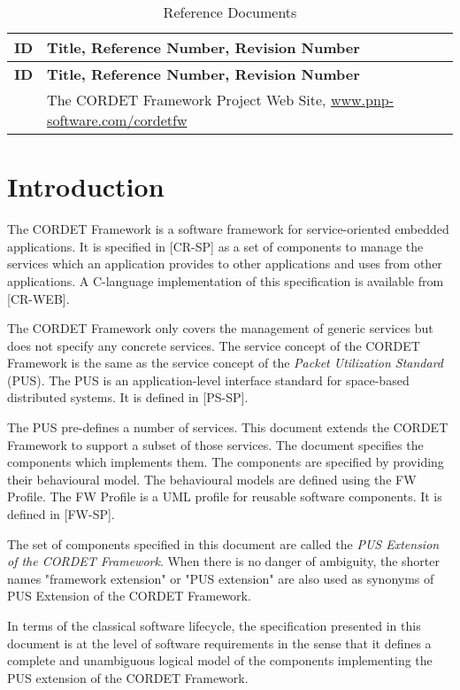 \documentclass{pnp_article}
\begin{document}
\begin{longtable}{|c|p{11cm}|}
\caption{Reference Documents} \label{tab:refDoc}\\
\hline
\rowcolor{light-gray}
\textbf{ID} & \textbf{Title, Reference Number, Revision Number} \\
\hline\hline
\endfirsthead
\rowcolor{light-gray}
\textbf{ID} & \textbf{Title, Reference Number, Revision Number} \\
\hline\hline
\endhead
[PS-WEB] & The CORDET Framework Project Web Site, \url{www.pnp-software.com/cordetfw} \\
\hline
\end{longtable}


\newpage


\section{Introduction}
The CORDET Framework is a software framework for service-oriented embedded applications. It is specified in [CR-SP] as a set of components to manage the services which an application provides to other applications and uses from other applications. A C-language implementation of this specification is available from [CR-WEB].

The CORDET Framework only covers the management of generic services but does not specify any concrete services. The service concept of the CORDET Framework is the same as the service concept of the \textit{Packet Utilization Standard} (PUS). The PUS is an application-level interface standard for space-based distributed systems. It is defined in [PS-SP].

The PUS pre-defines a number of services. This document extends the CORDET Framework to support a subset of those services. The document specifies the components which implements them. The components are specified by providing their behavioural model. The behavioural models are defined using the FW Profile. The FW Profile is a UML profile for reusable software components. It is defined in [FW-SP].

The set of components specified in this document are called the \textit{PUS Extension of the CORDET Framework}. When there is no danger of ambiguity, the shorter names "framework extension" or "PUS extension" are also used as synonyms of PUS Extension of the CORDET Framework.

In terms of the classical software lifecycle, the specification presented in this document is at the level of software requirements in the sense that it defines a complete and unambiguous logical model of the components implementing the PUS extension of the CORDET Framework.
\end{document}
